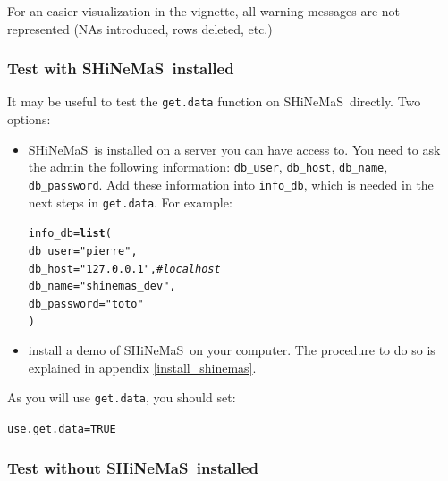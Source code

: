 \documentclass{article}\usepackage[]{graphicx}\usepackage[]{color}
\makeatletter
\newcommand{\hlnum}[1]{\textcolor[rgb]{0.686,0.059,0.569}{#1}}%
\newcommand{\hlstr}[1]{\textcolor[rgb]{0.192,0.494,0.8}{#1}}%
\newcommand{\hlcom}[1]{\textcolor[rgb]{0.678,0.584,0.686}{\textit{#1}}}%
\newcommand{\hlstd}[1]{\textcolor[rgb]{0.345,0.345,0.345}{#1}}%
\newcommand{\hlkwb}[1]{\textcolor[rgb]{0.69,0.353,0.396}{#1}}%
\newcommand{\hlkwc}[1]{\textcolor[rgb]{0.333,0.667,0.333}{#1}}%
\newcommand{\hlkwd}[1]{\textcolor[rgb]{0.737,0.353,0.396}{\textbf{#1}}}%
\newenvironment{kframe}{%
 \def\at@end@of@kframe{}%
 \ifinner\ifhmode%
  \def\at@end@of@kframe{\end{minipage}}%
  \begin{minipage}{\columnwidth}%
 \fi\fi%
 \def\FrameCommand##1{\hskip\@totalleftmargin \hskip-\fboxsep
 \colorbox{shadecolor}{##1}\hskip-\fboxsep
     \hskip-\linewidth \hskip-\@totalleftmargin \hskip\columnwidth}%
 \MakeFramed {\advance\hsize-\width
   \@totalleftmargin\z@ \linewidth\hsize
   \@setminipage}}%
 {\par\unskip\endMakeFramed%
 \at@end@of@kframe}
\newenvironment{knitrout}{}{} %
\newcommand{\BD}{SHiNeMaS}
\makeatother
\begin{document}
For an easier visualization in the vignette, all warning messages are not represented (NAs introduced, rows deleted, etc.)

\subsubsection{Test with \BD~installed}

It may be useful to test the \texttt{get.data} function on \BD~directly.
Two options:
\begin{itemize}
\item \BD~is installed on a server you can have access to. 
You need to ask the admin the following information: \texttt{db\_user}, \texttt{db\_host}, \texttt{db\_name}, \texttt{db\_password}. 
Add these information into \texttt{info\_db}, which is needed in the next steps in \texttt{get.data}.
For example: 

\begin{knitrout}
\color{fgcolor}\begin{kframe}
\begin{alltt}
\hlstd{info_db} \hlkwb{=} \hlkwd{list}\hlstd{(}
        \hlkwc{db_user} \hlstd{=} \hlstr{"pierre"}\hlstd{,}
        \hlkwc{db_host} \hlstd{=} \hlstr{"127.0.0.1"}\hlstd{,} \hlcom{# localhost}
        \hlkwc{db_name} \hlstd{=} \hlstr{"shinemas_dev"}\hlstd{,}
        \hlkwc{db_password} \hlstd{=} \hlstr{"toto"}
\hlstd{)}
\end{alltt}
\end{kframe}
\end{knitrout}

\item install a demo of \BD~on your computer.
The procedure to do so is explained in appendix \ref{install_shinemas}.

\end{itemize}

As you will use \texttt{get.data}, you should set:
\begin{knitrout}
\color{fgcolor}\begin{kframe}
\begin{alltt}
\hlstd{use.get.data} \hlkwb{=} \hlnum{TRUE}
\end{alltt}
\end{kframe}
\end{knitrout}

\subsubsection{Test without \BD~installed}
\end{document}
